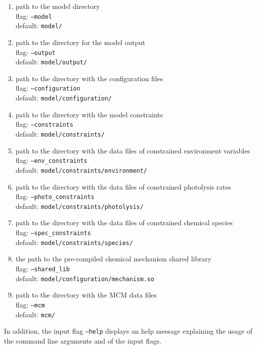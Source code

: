 \begin{enumerate}
\item path to the model directory\\
  flag: \texttt{--model}\\
  default: \texttt{model/}
\item path to the directory for the model output\\
 flag: \texttt{--output}\\
 default: \texttt{model/output/}
\item path to the directory with the configuration files\\
  flag: \texttt{--configuration}\\
  default: \texttt{model/configuration/}
\item path to the directory with the model constraints\\
  flag: \texttt{--constraints}\\
  default: \texttt{model/constraints/}
\item path to the directory with the data files of constrained environment variables\\
  flag: \texttt{--env\_constraints}\\
  default: \texttt{model/constraints/environment/}
\item path to the directory with the data files of constrained photolysis rates\\
  flag: \texttt{--photo\_constraints}\\
  default: \texttt{model/constraints/photolysis/}
\item path to the directory with the data files of constrained chemical species\\
  flag: \texttt{--spec\_constraints}\\
  default: \texttt{model/constraints/species/}
\item the path to the pre-compiled chemical mechanism shared library\\
  flag: \texttt{--shared\_lib}\\
  default: \texttt{model/configuration/mechanism.so}
\item path to the directory with the MCM data files\\
  flag: \texttt{--mcm}\\
  default: \texttt{mcm/}
\end{enumerate}

In addition, the input flag \texttt{--help} displays an help message
explaining the usage of the command line arguments and of the input
flags.

